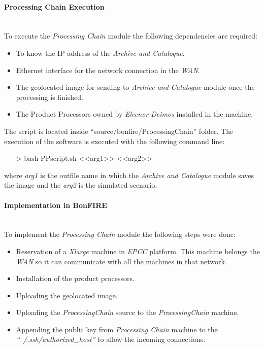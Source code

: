 \paragraph{Processing Chain Execution}~\\

To execute the \emph{Processing Chain} module the following dependencies are
required:
\begin{itemize}
\item To know the \ac{IP} address of the \emph{Archive and Catalogue}.
\item Ethernet interface for the network connection in the \bonfire \emph{WAN}.
\item The geolocated image for sending to \emph{Archive and Catalogue} module
  once the processing is finished. 
\item The Product Processors owned by \emph{Elecnor Deimos} installed in the
  machine.
\end{itemize}

The script is located inside
``source/bonfire/ProcessingChain'' folder. The execution of the software is executed with the following
command line:
\begin{itemize}
\item[>] bash PPscript.sh <<arg1>> <<arg2>>
\end{itemize}
where \emph{arg1} is the outfile name in which the \emph{Archive and Catalogue} module
saves the image and the \emph{arg2} is the simulated scenario.


\paragraph{Implementation in BonFIRE}~\\

To implement the \emph{Processing Chain} module the following steps were done:

\begin{itemize}
 \item Reservation of a \emph{Xlarge} machine in \emph{EPCC} \bonfire
   platform. This machine belongs the \bonfire \emph{WAN} so it can communicate
   with all the machines in that network. 
 \item Installation of the product processors.
 \item Uploading the geolocated image.
 \item Uploading the \emph{ProcessingChain} source to the \emph{ProcessingChain}
   machine.
 \item Appending the public key from \emph{Processing Chain} machine to the
   \emph{``~/.ssh/authorized\_host''} to allow the incoming connections.
\end{itemize}

